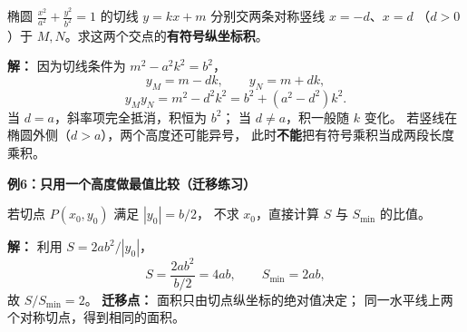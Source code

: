 \begin{examplebox}
椭圆 $\frac{x^2}{a^2}+\frac{y^2}{b^2}=1$ 的切线
$y=kx+m$ 分别交两条对称竖线 $x=-d$、$x=d$
（$d>0$）于 $M,N$。求这两个交点的\textbf{有符号纵坐标积}。

\textbf{解：} 因为切线条件为 $m^2-a^2k^2=b^2$，
\[
y_M=m-dk,\qquad y_N=m+dk,
\]
\[
\boxed{y_My_N=m^2-d^2k^2=b^2+(a^2-d^2)k^2.}
\]
当 $d=a$，斜率项完全抵消，积恒为 $b^2$；
当 $d\ne a$，积一般随 $k$ 变化。
若竖线在椭圆外侧（$d>a$），两个高度还可能异号，
此时\textbf{不能}把有符号乘积当成两段长度乘积。

\medskip
\textbf{例6：只用一个高度做最值比较（迁移练习）}

若切点 $P(x_0,y_0)$ 满足 $|y_0|=b/2$，
不求 $x_0$，直接计算 $S$ 与 $S_{\min}$ 的比值。

\textbf{解：} 利用 $S=2ab^2/|y_0|$，
\[
S=\frac{2ab^2}{b/2}=4ab,
\qquad S_{\min}=2ab,
\]
故 $\boxed{S/S_{\min}=2}$。
\textbf{迁移点：} 面积只由切点纵坐标的绝对值决定；
同一水平线上两个对称切点，得到相同的面积。
\end{examplebox}
